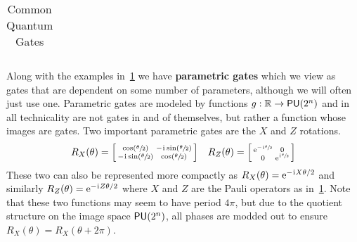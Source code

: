 \begin{table}[ht]
\begin{tabular}{cccc}
    \end{tabular}
    \caption{Common Quantum Gates}\label{tab:commongates}
\end{table}

Along with the examples in~\cref{tab:commongates} we have \textbf{parametric gates} which we view as gates that are dependent on some number of parameters, although we will often just use one.
Parametric gates are modeled by functions $g: \mathbb{R} \to \mathsf{PU} (2^n)$ and in all technicality are not gates in and of themselves, but rather a function whose images are gates.
Two important parametric gates are the $X$ and $Z$ rotations.
\begin{align} %
    R_X(\theta) = \smqty[\cos(\sfrac{\theta}{2}) & -\iu \sin(\sfrac{\theta}{2}) \\ -\iu \sin(\sfrac{\theta}{2}) & \cos(\sfrac{\theta}{2})] && R_Z(\theta) = \smqty[\e^{-\iu \sfrac{\theta}{2}} & 0 \\0 & \e^{\iu\sfrac{\theta}{2}}]
\end{align}
These two can also be represented more compactly as $R_X(\theta) = \mathrm{e}^{-\mkern1mu\mathrm{i}\mkern1mu X \theta / 2}$ and similarly $R_Z(\theta) = \mathrm{e}^{-\mkern1mu\mathrm{i}\mkern1mu Z \theta/2}$ where $X$ and $Z$ are the Pauli operators as in~\cref{tab:commongates}.
Note that these two functions may seem to have period $4\pi$, but due to the quotient structure on the image space $\mathsf{PU} (2^n)$, all phases are modded out to ensure $R_X(\theta) = R_X(\theta + 2\pi)$.

